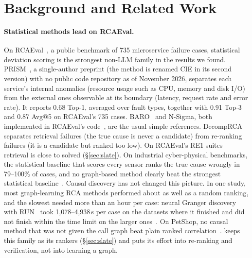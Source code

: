 \section{Background and Related Work}
\label{sec:related}

\paragraph{Statistical methods lead on RCAEval.}
On RCAEval~\cite{rcaeval2024}, a public benchmark of 735 microservice failure cases, statistical deviation scoring is the strongest non-LLM family in the results we found.
PRISM~\cite{prism2026}, a single-author preprint (the method is renamed CIE in its second version) with no public code repository as of November 2026, separates each service's internal anomalies (resource usage such as CPU, memory and disk I/O) from the external ones observable at its boundary (latency, request rate and error rate). It reports 0.68 Top-1, averaged over fault types, together with 0.91 Top-3 and 0.87 Avg@5 on RCAEval's 735 cases.
BARO~\cite{baro2024} and N-Sigma, both implemented in RCAEval's code~\cite{rcaeval2024}, are the usual simple references.
DecompRCA~\cite{decomprca2026} separates retrieval failures (the true cause is never a candidate) from re-ranking failures (it is a candidate but ranked too low).
On RCAEval's RE1 suites retrieval is close to solved (\S\ref{sec:slate}). On industrial cyber-physical benchmarks, the statistical baseline that scores every sensor ranks the true cause wrongly in 79--100\% of cases, and no graph-based method clearly beat the strongest statistical baseline~\cite{decomprca2026}.
Causal discovery has not changed this picture.
In one study, most graph-learning RCA methods performed about as well as a random ranking, and the slowest needed more than an hour per case: neural Granger discovery with RUN~\cite{run2024} took 1,078--4,938\,s per case on the datasets where it finished and did not finish within the time limit on the larger ones~\cite{causalinference2024ase}.
On PetShop, no causal method that was not given the call graph beat plain ranked correlation~\cite{petshop2024}.
\sys keeps this family as its rankers (\S\ref{sec:slate}) and puts its effort into re-ranking and verification, not into learning a graph.

